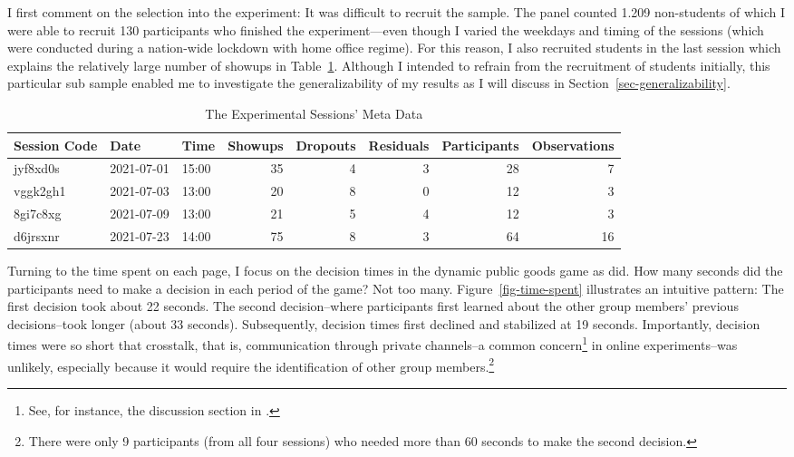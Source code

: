 \documentclass[
  authoryear,
  preprint,
  3p]{elsarticle}
\begin{document}
I first comment on the selection into the experiment: It was difficult
to recruit the sample. The panel counted 1.209 non-students of which I
were able to recruit 130 participants who finished the experiment---even
though I varied the weekdays and timing of the sessions (which were
conducted during a nation-wide lockdown with home office regime). For
this reason, I also recruited students in the last session which
explains the relatively large number of showups in Table~\ref{tbl-meta}.
Although I intended to refrain from the recruitment of students
initially, this particular sub sample enabled me to investigate the
generalizability of my results as I will discuss in
Section~\ref{sec-generalizability}.

\hypertarget{tbl-meta}{}
\begin{table}
\caption{\label{tbl-meta}The Experimental Sessions' Meta Data }\tabularnewline

\centering
\begin{tabular}{l|l|l|r|r|r|r|r}
\hline
Session Code & Date & Time & Showups & Dropouts & Residuals & Participants & Observations\\
\hline
jyf8xd0s & 2021-07-01 & 15:00 & 35 & 4 & 3 & 28 & 7\\
\hline
vggk2gh1 & 2021-07-03 & 13:00 & 20 & 8 & 0 & 12 & 3\\
\hline
8gi7c8xg & 2021-07-09 & 13:00 & 21 & 5 & 4 & 12 & 3\\
\hline
d6jrsxnr & 2021-07-23 & 14:00 & 75 & 8 & 3 & 64 & 16\\
\hline
\end{tabular}
\end{table}

Turning to the time spent on each page, I focus on the decision times in
the dynamic public goods game as \citet{Anderhub2001} did. How many
seconds did the participants need to make a decision in each period of
the game? Not too many. Figure~\ref{fig-time-spent} illustrates an
intuitive pattern: The first decision took about 22 seconds. The second
decision--where participants first learned about the other group
members' previous decisions--took longer (about 33 seconds).
Subsequently, decision times first declined and stabilized at 19
seconds. Importantly, decision times were so short that crosstalk, that
is, communication through private channels--a common concern\footnote{See,
  for instance, the discussion section in \citet[p.~119]{AGM2018}.} in
online experiments--was unlikely, especially because it would require
the identification of other group members.\footnote{There were only 9
  participants (from all four sessions) who needed more than 60 seconds
  to make the second decision.}
\end{document}
